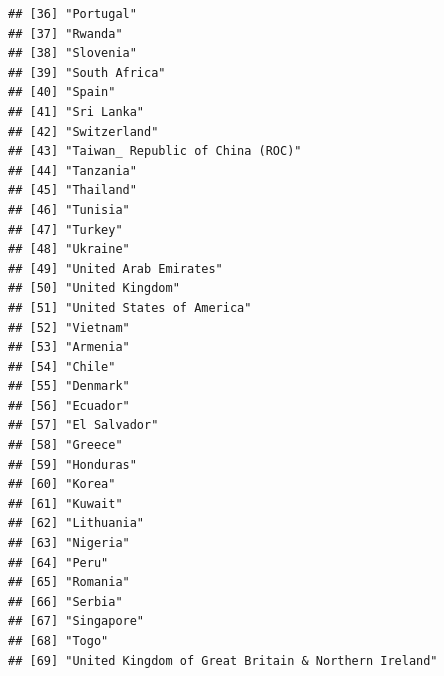 \documentclass[
]{article}
\newenvironment{Shaded}{\begin{snugshade}}{\end{snugshade}}
\newcommand{\CommentTok}[1]{\textcolor[rgb]{0.56,0.35,0.01}{\textit{#1}}}
\newcommand{\FunctionTok}[1]{\textcolor[rgb]{0.13,0.29,0.53}{\textbf{#1}}}
\newcommand{\NormalTok}[1]{#1}
\newcommand{\SpecialCharTok}[1]{\textcolor[rgb]{0.81,0.36,0.00}{\textbf{#1}}}
\begin{document}
\begin{verbatim}
## [36] "Portugal"                                          
## [37] "Rwanda"                                            
## [38] "Slovenia"                                          
## [39] "South Africa"                                      
## [40] "Spain"                                             
## [41] "Sri Lanka"                                         
## [42] "Switzerland"                                       
## [43] "Taiwan_ Republic of China (ROC)"                   
## [44] "Tanzania"                                          
## [45] "Thailand"                                          
## [46] "Tunisia"                                           
## [47] "Turkey"                                            
## [48] "Ukraine"                                           
## [49] "United Arab Emirates"                              
## [50] "United Kingdom"                                    
## [51] "United States of America"                          
## [52] "Vietnam"                                           
## [53] "Armenia"                                           
## [54] "Chile"                                             
## [55] "Denmark"                                           
## [56] "Ecuador"                                           
## [57] "El Salvador"                                       
## [58] "Greece"                                            
## [59] "Honduras"                                          
## [60] "Korea"                                             
## [61] "Kuwait"                                            
## [62] "Lithuania"                                         
## [63] "Nigeria"                                           
## [64] "Peru"                                              
## [65] "Romania"                                           
## [66] "Serbia"                                            
## [67] "Singapore"                                         
## [68] "Togo"                                              
## [69] "United Kingdom of Great Britain & Northern Ireland"
\end{verbatim}

\begin{Shaded}
\end{Shaded}
\end{document}
